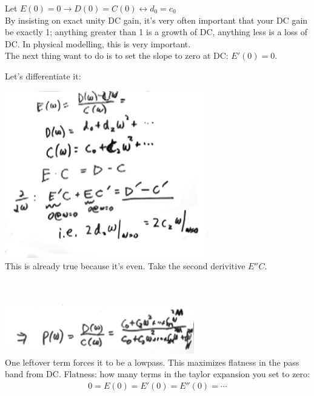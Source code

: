 Let $E(0) = 0 \rightarrow D(0) = C(0) \leftrightarrow d_0 = c_0$ \\

By insisting on exact unity DC gain, it's very often important that your
DC gain be exactly 1; anything greater than 1 is a growth of DC, anything less
is a loss of DC. In physical modelling, this is very important.\\

The next thing want to do is to set the slope to zero at DC: $E'(0) = 0$.

Let's differentiate it:

\includegraphics[scale=0.5]{frames/14e}\\

This is already true because it's even. Take the second derivitive $E''C$.

 \\
\\
\includegraphics[scale=0.5]{frames/14f}\\

One leftover term forces it to be a lowpass. This maximizes flatness in
the pass band from DC. Flatness: how many terms in the taylor expansion you set to zero:
\begin{align*}
    0 = E(0) = E'(0) = E''(0) = \cdots 
\end{align*}


